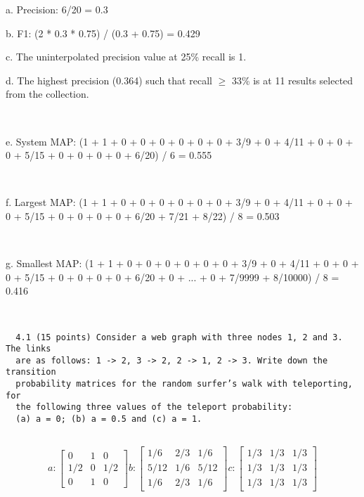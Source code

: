 \documentclass[12pt]{article}
\newcommand{\mt}[1]{\ensuremath{#1}}
\newcommand{\gre}{\mt{\geq} }
\begin{document}
a. Precision: 6/20 = 0.3

b. F1: (2 * 0.3 * 0.75) / (0.3 + 0.75) = 0.429

c. The uninterpolated precision value at 25\% recall is 1.

d. The highest precision (0.364) such that recall \gre 33\% is at 11 results selected from the collection.

\

e. System MAP: (1 + 1 + 0 + 0 + 0 + 0 + 0 + 0 + 3/9 + 0 + 4/11 + 0 + 0 + 0 + 5/15 + 0 + 0 + 0 + 0 + 6/20) / 6 = 0.555

\

f. Largest MAP: (1 + 1 + 0 + 0 + 0 + 0 + 0 + 0 + 3/9 + 0 + 4/11 + 0 + 0 + 0 + 5/15 + 0 + 0 + 0 + 0 + 6/20 + 7/21 + 8/22) / 8 = 0.503

\

g. Smallest MAP: (1 + 1 + 0 + 0 + 0 + 0 + 0 + 0 + 3/9 + 0 + 4/11 + 0 + 0 + 0 + 5/15 + 0 + 0 + 0 + 0 + 6/20 + 0 + ... + 0 + 7/9999 + 8/10000) / 8 = 0.416

\

\begin{verbatim}
  4.1 (15 points) Consider a web graph with three nodes 1, 2 and 3. The links
  are as follows: 1 -> 2, 3 -> 2, 2 -> 1, 2 -> 3. Write down the transition
  probability matrices for the random surfer’s walk with teleporting, for
  the following three values of the teleport probability:
  (a) a = 0; (b) a = 0.5 and (c) a = 1.
  
\end{verbatim}

\begin{displaymath} a:
  \begin{bmatrix}
     0 & 1 & 0\\
     1/2 & 0 & 1/2 \\
     0 & 1 & 0  
  \end{bmatrix} b:
  \begin{bmatrix}
     1/6 & 2/3 & 1/6 \\
     5/12 & 1/6 & 5/12 \\
     1/6 & 2/3 & 1/6 
  \end{bmatrix} c:
  \begin{bmatrix}
     1/3 & 1/3 & 1/3 \\
     1/3 & 1/3 & 1/3 \\
     1/3 & 1/3 & 1/3  
  \end{bmatrix}
\end{displaymath}

\
\end{document}
